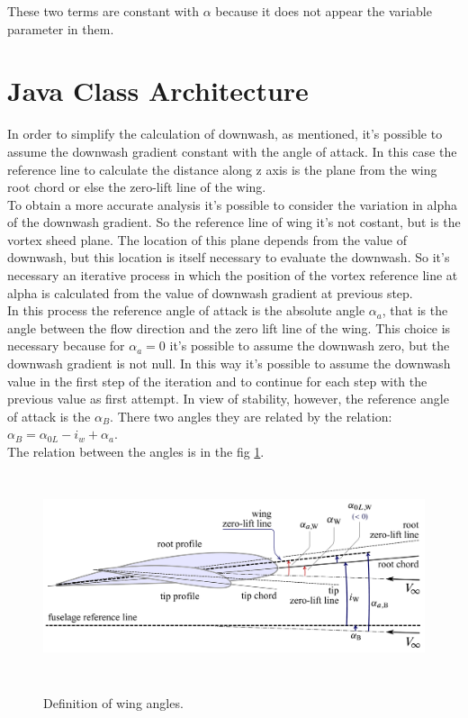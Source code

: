 These two terms are constant with $\alpha$ because  it does not appear the variable parameter in them.


\section{Java Class Architecture}

In order to simplify the calculation of downwash, as mentioned, it's possible to assume the downwash gradient constant with the angle of attack. In this case the reference line to calculate the distance along z axis is the plane from the wing root chord or else the zero-lift line of the wing.\\
To obtain a more accurate analysis it's possible to consider the variation in alpha of the downwash gradient. So the reference line of wing it's not costant, but is the vortex sheed plane. The location of this plane depends from the value of downwash, but this location is itself necessary to evaluate the downwash. So it's necessary an iterative process in which the position of the vortex reference line at alpha is calculated from the value of downwash gradient at previous step.\\ 

In this process the reference angle of attack is the absolute angle $\alpha_a$, that is the angle between the flow direction and the zero lift line of the wing. This choice is necessary because for $\alpha_a = 0$ it's possible to assume the downwash zero, but the downwash gradient is not null. In this way it's possible to assume the downwash value in the first step of the iteration and to continue for each step with the previous value as first attempt.
In view of stability, however, the reference angle of attack is the $\alpha_B$. There two angles they are related by the relation: $ \alpha_B =\alpha_{0L} - i_w + \alpha_a $. \\The relation between the angles is in the fig \ref{anglesDef}.

\begin{figure}[H]
\centering
{\includegraphics[height=6cm]{Immagini/Wing_Alpha_Zero_List.pdf}} 
\caption{Definition of wing angles.}
\label{anglesDef}
\end{figure} 



